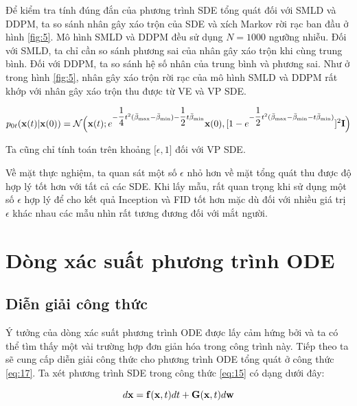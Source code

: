 \documentclass{article} %
\begin{document}
Để kiểm tra tính đúng đắn của phương trình SDE tổng quát đối với SMLD và DDPM, ta so sánh nhân gây xáo trộn của SDE và xích Markov rời rạc ban đầu ở hình \ref{fig:5}.
Mô hình SMLD và DDPM đều sử dụng $N=1000$ ngưỡng nhiễu.
Đối với SMLD, ta chỉ cần so sánh phương sai của nhân gây xáo trộn khi cùng trung bình.
Đối với DDPM, ta so sánh hệ số nhân của trung bình và phương sai.
Như ở trong hình \ref{fig:5}, nhân gây xáo trộn rời rạc của mô hình SMLD và DDPM rất khớp với nhân gây xáo trộn thu được từ VE và VP SDE.

\begin{equation}
    p_{0t}(\bold{x}(t) \vert \bold{x}(0)) = \mathcal{N} \Big( \bold{x}(t); e^{-\dfrac{1}{4}t^2 (\bar{\beta}_{\max} - \bar{\beta}_{\min}) - \dfrac{1}{2}t\bar{\beta}_{\min}} \bold{x}(0), \lbrack 1 - e^{-\dfrac{1}{2}t^2 (\bar{\beta}_{\max} - \bar{\beta}_{\min} - t\bar{\beta}_{\min})} \rbrack^2 \bold{I} \Big)
\end{equation}

Ta cũng chỉ tính toán trên khoảng $\lbrack \epsilon, 1 \rbrack$ đối với VP SDE.

Về mặt thực nghiệm, ta quan sát một số $\epsilon$ nhỏ hơn về mặt tổng quát thu được độ hợp lý tốt hơn với tất cả các SDE.
Khi lấy mẫu, rất quan trọng khi sử dụng một số $\epsilon$ hợp lý để cho kết quả Inception và FID tốt hơn mặc dù đối với nhiều giá trị $\epsilon$ khác nhau các mẫu nhìn rất tương đương đối với mắt người. 


\section{Dòng xác suất phương trình ODE} \label{D}

\subsection{Diễn giải công thức} \label{D.1}

Ý tưởng của dòng xác suất phương trình ODE được lấy cảm hứng bởi \citep{maoutsa2020interacting} và ta có thể tìm thấy một vài trường hợp đơn giản hóa trong công trình này.
Tiếp theo ta sẽ cung cấp diễn giải công thức cho phương trình ODE tổng quát ở công thức \ref{eq:17}.
Ta xét phương trình SDE trong công thức \ref{eq:15} có dạng dưới đây:

\begin{equation*}
    d \bold{x} = \bold{f} (\bold{x}, t) dt + \bold{G}(\bold{x}, t) d \bold{w}
\end{equation*}
\end{document}
